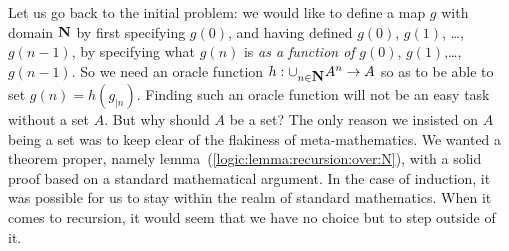 Let us go back to the initial problem: we would like to define a map
$g$ with domain $\mbox{$\bf N$}$ by first specifying $g(0)$, and having defined
$g(0)$, $g(1)$, \ldots,  $g(n-1)$, by specifying what $g(n)$ is {\em
as a function of} $g(0)$, $g(1)$,\ldots, $g(n-1)$. So we need an
oracle function $h:\cup_{n\in\mbox{$\bf N$}}A^{n}\to A$ so as to be able to set
$g(n)=h(g_{|n})$. Finding such an oracle function will not be an
easy task without a set $A$. But why should $A$ be a set? The only
reason we insisted on $A$ being a set was to keep clear of the
flakiness of meta-mathematics. We wanted a theorem proper, namely
lemma~(\ref{logic:lemma:recursion:over:N}), with a solid proof based
on a standard mathematical argument. In the case of induction, it
was possible for us to stay within the realm of standard
mathematics. When it comes to recursion, it would seem that we have
no choice but to step outside of it.

